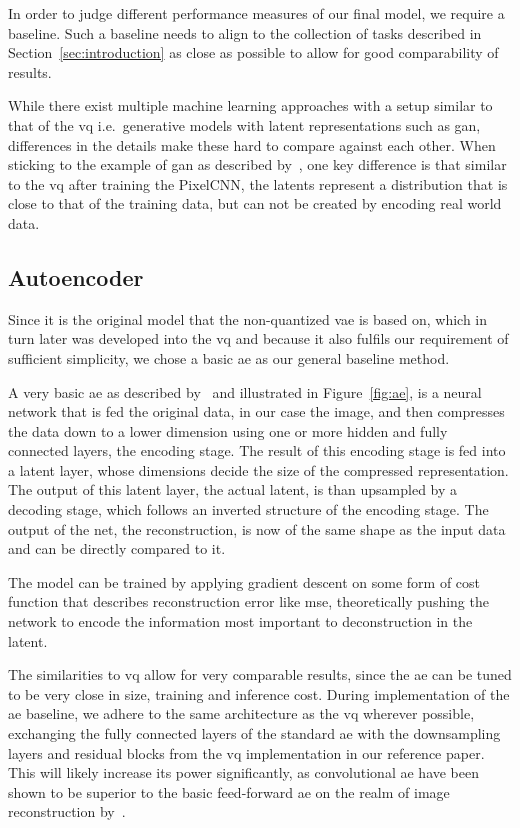 
In order to judge different performance measures of our final model, we require a baseline.
Such a baseline needs to align to the collection of tasks described in Section~\ref{sec:introduction} as close as
possible to allow for good comparability of results.

While there exist multiple machine learning approaches with a setup similar to that of the \ac{vq}
i.e.\ generative models with latent representations such as \ac{gan}, differences in the details make these hard to
compare against each other.
When sticking to the example of \ac{gan} as described by~\cite{gan}, one key difference is that similar to the
\ac{vq} after training the PixelCNN, the latents represent a distribution that is close to that of the training
data, but can not be created by encoding real world data.

\subsection{Autoencoder}\label{subsec:autoencoder}
Since it is the original model that the non-quantized \ac{vae} is based on, which in turn later was developed into the
\ac{vq} and because it also fulfils our requirement of sufficient simplicity, we chose a basic \ac{ae} as our general
baseline method.

A very basic \ac{ae} as described by~\cite{autoenc} and illustrated in Figure~\ref{fig:ae}, is a neural
network that is fed
the
original data, in our case the
image, and then compresses the data down to a lower dimension using one or more hidden and fully connected layers,
the encoding stage.
The result of this encoding stage is fed into a latent layer, whose dimensions decide the size of the compressed
representation.
The output of this latent layer, the actual latent, is than upsampled by a decoding stage, which follows an inverted
structure of the encoding stage.
The output of the net, the reconstruction, is now of the same shape as the input data and can be directly compared
to it.

The model can be trained by applying gradient descent on some form of cost function that describes reconstruction error
like \ac{mse}, theoretically pushing the network to encode the information most important to deconstruction in the
latent.

The similarities to \ac{vq} allow for very comparable results, since the \ac{ae} can be tuned to be very
close in size, training and inference cost.
During implementation of the \ac{ae} baseline, we adhere to the same architecture as the \ac{vq} wherever possible,
exchanging the fully connected layers of the standard \ac{ae} with the downsampling layers and
residual blocks from the \ac{vq} implementation in our reference paper.
This will likely increase its power significantly, as convolutional \ac{ae} have been shown to be superior to the
basic feed-forward \ac{ae} on the realm of image reconstruction by~\cite{convae}.

